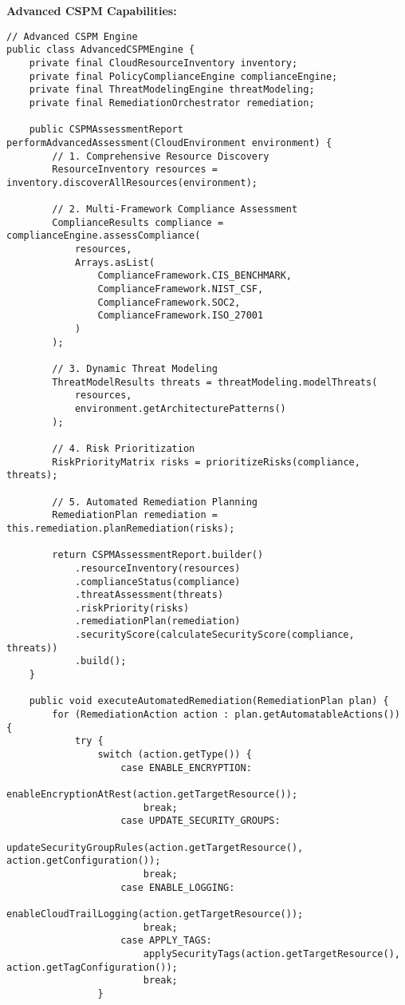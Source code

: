 \textbf{Advanced CSPM Capabilities:}
\begin{lstlisting}[breaklines=true,basicstyle=\ttfamily\footnotesize]
// Advanced CSPM Engine
public class AdvancedCSPMEngine {
    private final CloudResourceInventory inventory;
    private final PolicyComplianceEngine complianceEngine;
    private final ThreatModelingEngine threatModeling;
    private final RemediationOrchestrator remediation;
    
    public CSPMAssessmentReport performAdvancedAssessment(CloudEnvironment environment) {
        // 1. Comprehensive Resource Discovery
        ResourceInventory resources = inventory.discoverAllResources(environment);
        
        // 2. Multi-Framework Compliance Assessment
        ComplianceResults compliance = complianceEngine.assessCompliance(
            resources,
            Arrays.asList(
                ComplianceFramework.CIS_BENCHMARK,
                ComplianceFramework.NIST_CSF,
                ComplianceFramework.SOC2,
                ComplianceFramework.ISO_27001
            )
        );
        
        // 3. Dynamic Threat Modeling
        ThreatModelResults threats = threatModeling.modelThreats(
            resources,
            environment.getArchitecturePatterns()
        );
        
        // 4. Risk Prioritization
        RiskPriorityMatrix risks = prioritizeRisks(compliance, threats);
        
        // 5. Automated Remediation Planning
        RemediationPlan remediation = this.remediation.planRemediation(risks);
        
        return CSPMAssessmentReport.builder()
            .resourceInventory(resources)
            .complianceStatus(compliance)
            .threatAssessment(threats)
            .riskPriority(risks)
            .remediationPlan(remediation)
            .securityScore(calculateSecurityScore(compliance, threats))
            .build();
    }
    
    public void executeAutomatedRemediation(RemediationPlan plan) {
        for (RemediationAction action : plan.getAutomatableActions()) {
            try {
                switch (action.getType()) {
                    case ENABLE_ENCRYPTION:
                        enableEncryptionAtRest(action.getTargetResource());
                        break;
                    case UPDATE_SECURITY_GROUPS:
                        updateSecurityGroupRules(action.getTargetResource(), action.getConfiguration());
                        break;
                    case ENABLE_LOGGING:
                        enableCloudTrailLogging(action.getTargetResource());
                        break;
                    case APPLY_TAGS:
                        applySecurityTags(action.getTargetResource(), action.getTagConfiguration());
                        break;
                }
                

\end{lstlisting}
